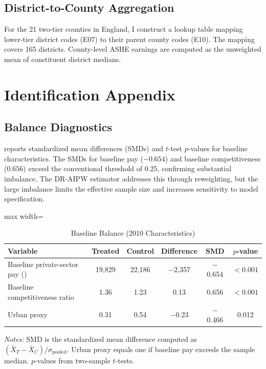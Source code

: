 \documentclass[12pt]{article}
\begin{document}
\subsection{District-to-County Aggregation}

For the 21 two-tier counties in England, I construct a lookup table mapping lower-tier district codes (E07) to their parent county codes (E10). The mapping covers 165 districts. County-level ASHE earnings are computed as the unweighted mean of constituent district medians.

\section{Identification Appendix}\label{app:id}

\subsection{Balance Diagnostics}

 reports standardized mean differences (SMDs) and $t$-test $p$-values for baseline characteristics. The SMDs for baseline pay ($-0.654$) and baseline competitiveness ($0.656$) exceed the conventional threshold of 0.25, confirming substantial imbalance. The DR-AIPW estimator addresses this through reweighting, but the large imbalance limits the effective sample size and increases sensitivity to model specification.

\begin{table}[H]
\centering
\caption{Baseline Balance (2010 Characteristics)}
\label{tab:balance}
\begin{adjustbox}{max width=\textwidth}
\begin{threeparttable}
\begin{tabular}{lccccc}
\toprule
Variable & Treated & Control & Difference & SMD & $p$-value \\
\midrule
Baseline private-sector pay (\textsterling{}) & 19,829 & 22,186 & $-$2,357 & $-$0.654 & $<0.001$ \\
Baseline competitiveness ratio & 1.36 & 1.23 & 0.13 & 0.656 & $<0.001$ \\
Urban proxy & 0.31 & 0.54 & $-$0.23 & $-$0.466 & 0.012 \\
\bottomrule
\end{tabular}
\begin{tablenotes}[flushleft]
\small
\item \textit{Notes:} SMD is the standardized mean difference computed as $({\bar{X}}_T - {\bar{X}}_C) / \sigma_{\text{pooled}}$. Urban proxy equals one if baseline pay exceeds the sample median. $p$-values from two-sample $t$-tests.
\end{tablenotes}
\end{threeparttable}
\end{adjustbox}
\end{table}
\end{document}
